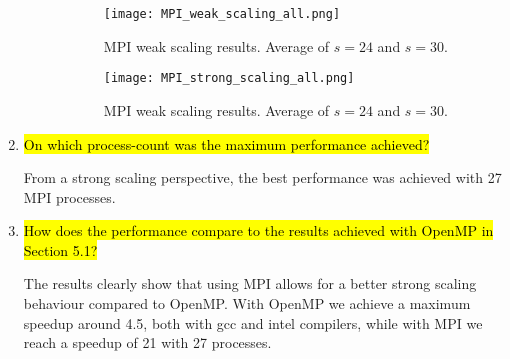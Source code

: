 \documentclass{article}
\begin{document}
\begin{enumerate}
\begin{description}
		\begin{figure}[p] %
		 	\begin{center}
		 		\texttt{[image: MPI\_weak\_scaling\_all.png]} %
		 		\caption{MPI weak scaling results. Average of $s=24$ and $s=30$.}
		 		\label{fig:MPI_weakScaling}
		 	\end{center}
		\end{figure}
		\begin{figure}[p] %
		 	\begin{center}
		 		\texttt{[image: MPI\_strong\_scaling\_all.png]} %
		 		\caption{MPI weak scaling results. Average of $s=24$ and $s=30$.}
		 		\label{fig:MPI_strongScaling}
		 	\end{center}
		\end{figure}
	\end{description}

	\item \hl{On which process-count was the maximum performance achieved?}

	From a strong scaling perspective, the best performance was achieved with 27 MPI processes.

	\item \hl{How does the performance compare to the results achieved with OpenMP in Section 5.1?}

	The results clearly show that using MPI allows for a better strong scaling behaviour compared to OpenMP. With OpenMP we achieve a maximum speedup around 4.5, both with gcc and intel compilers, while with MPI we reach a speedup of 21 with 27 processes.
\end{enumerate}
\end{document}
